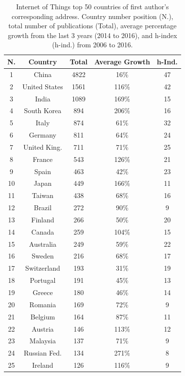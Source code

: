 \documentclass[symmetry,article,accept,moreauthors,pdftex10pt,a4paper]{mdpi}
\begin{document}
\begin{table}[H]
	\centering
	\caption{Internet of Things top 50 countries of first author's corresponding address. Country number position (N.), total number of publications (Total), average percentage growth from the last 3 years (2014 to 2016), and h-index (h-ind.) from 2006 to 2016.}
	\label{table_countries}
	\begin{tabular}{ccccc}
  \toprule
	{\textbf{N.}} & {\textbf{Country}} &{\textbf{Total}} &{\textbf{Average Growth}} & {\textbf{h-Ind.}} \\
	\midrule
		1 & China & 4822 & 16\% & 47 \\
		2 & United States & 1561 & 116\% & 42  \\
		3 & India & 1089 & 169\% & 15  \\
		4 & South Korea & 894 & 206\% & 16   \\
		5 & Italy & 874 & 61\% & 32   \\
		6 & Germany & 811 & 64\% & 24   \\
		7 & United King. & 711 & 71\% & 25  \\
		8 & France & 543 & 126\% & 21  \\
		9 & Spain & 463 & 42\% & 23  \\
		10 & Japan & 449 & 166\% & 11   \\
		11 & Taiwan & 438 & 68\% & 16 \\
		12 & Brazil & 272 & 90\% & 9 \\ 
		13 & Finland & 266 & 50\% & 20 \\ 
		14 & Canada & 259 & 104\% & 15 \\ 
		15 & Australia & 249 & 59\% & 22 \\ 
		16 & Sweden & 216 & 68\% & 17 \\ 
		17 & Switzerland & 193 & 31\% & 19 \\
		18 & Portugal & 191 & 45\% & 13 \\ 
		19 & Greece & 180 & 46\% & 14 \\ 
		20 & Romania & 169 & 72\% & 9 \\ 
		21 & Belgium & 164 & 87\% & 11 \\ 
		22 & Austria & 146 & 113\% & 12 \\ 
		23 & Malaysia & 137 & 71\% & 9 \\ 
		24 & Russian Fed. & 134 & 271\% & 8 \\
		25 & Ireland & 126 & 116\% & 9 \\

\end{tabular}
\end{table}
\end{document}
